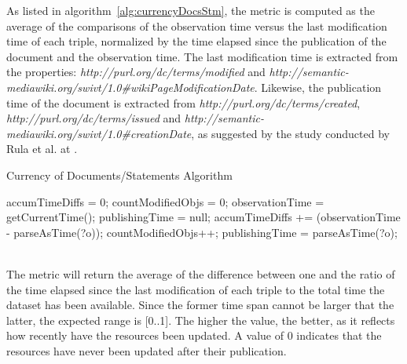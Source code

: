 As listed in algorithm~\ref{alg:currencyDocsStm}, the metric is computed as the average of the comparisons of the observation time versus the last modification time of each triple, normalized by the time elapsed since the publication of the document and the observation time. The last modification time is extracted from the properties: \textit{http://purl.org/dc/terms/modified} and \textit{http://semantic-mediawiki.org/swivt/1.0\#wikiPageModificationDate}. Likewise, the publication time of the document is extracted from \textit{http://purl.org/dc/terms/created}, \textit{http://purl.org/dc/terms/issued} and \textit{http://semantic-mediawiki.org/swivt/1.0\#creationDate}, as suggested by the study conducted by Rula et al. at \cite{Rula2012}.
\begin{algorithm}
\caption{Currency of Documents/Statements Algorithm} \label{alg:currencyDocsStm}
\begin{algorithmic}[1]
\State accumTimeDiffs = 0;
\State countModifiedObjs = 0;
\State observationTime = getCurrentTime();
\State publishingTime = null;
\EndProcedure
{}
\State accumTimeDiffs += (observationTime - parseAsTime(?o));
\State countModifiedObjs++;
\EndIf
{} 
\State publishingTime = parseAsTime(?o);
\EndIf ~\\
\EndProcedure
\end{algorithmic}
\end{algorithm}
The metric will return the average of the difference between one and the ratio of the time elapsed since the last modification of each triple to the total time the dataset has been available. Since the former time span cannot be larger that the latter, the expected range is [0..1]. The higher the value, the better, as it reflects how recently have the resources been updated. A value of 0 indicates that the resources have never been updated after their publication.


